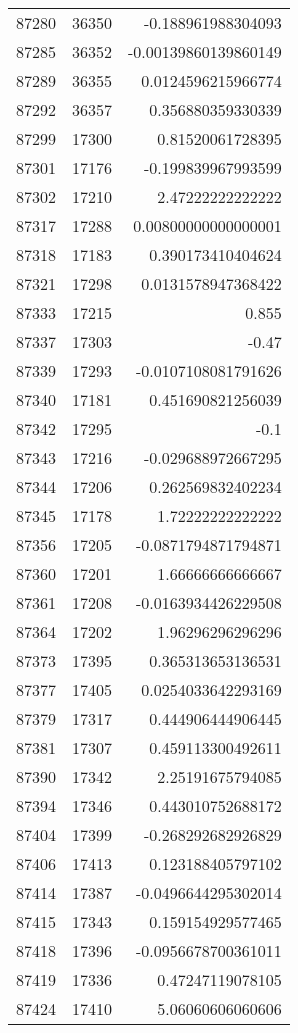 \begin{tabular}{r | r | r}
87280 & 36350 & -0.188961988304093 \\
87285 & 36352 & -0.00139860139860149 \\
87289 & 36355 & 0.0124596215966774 \\
87292 & 36357 & 0.356880359330339 \\
87299 & 17300 & 0.81520061728395 \\
87301 & 17176 & -0.199839967993599 \\
87302 & 17210 & 2.47222222222222 \\
87317 & 17288 & 0.00800000000000001 \\
87318 & 17183 & 0.390173410404624 \\
87321 & 17298 & 0.0131578947368422 \\
87333 & 17215 & 0.855 \\
87337 & 17303 & -0.47 \\
87339 & 17293 & -0.0107108081791626 \\
87340 & 17181 & 0.451690821256039 \\
87342 & 17295 & -0.1 \\
87343 & 17216 & -0.029688972667295 \\
87344 & 17206 & 0.262569832402234 \\
87345 & 17178 & 1.72222222222222 \\
87356 & 17205 & -0.0871794871794871 \\
87360 & 17201 & 1.66666666666667 \\
87361 & 17208 & -0.0163934426229508 \\
87364 & 17202 & 1.96296296296296 \\
87373 & 17395 & 0.365313653136531 \\
87377 & 17405 & 0.0254033642293169 \\
87379 & 17317 & 0.444906444906445 \\
87381 & 17307 & 0.459113300492611 \\
87390 & 17342 & 2.25191675794085 \\
87394 & 17346 & 0.443010752688172 \\
87404 & 17399 & -0.268292682926829 \\
87406 & 17413 & 0.123188405797102 \\
87414 & 17387 & -0.0496644295302014 \\
87415 & 17343 & 0.159154929577465 \\
87418 & 17396 & -0.0956678700361011 \\
87419 & 17336 & 0.47247119078105 \\
87424 & 17410 & 5.06060606060606 \\

\end{tabular}
